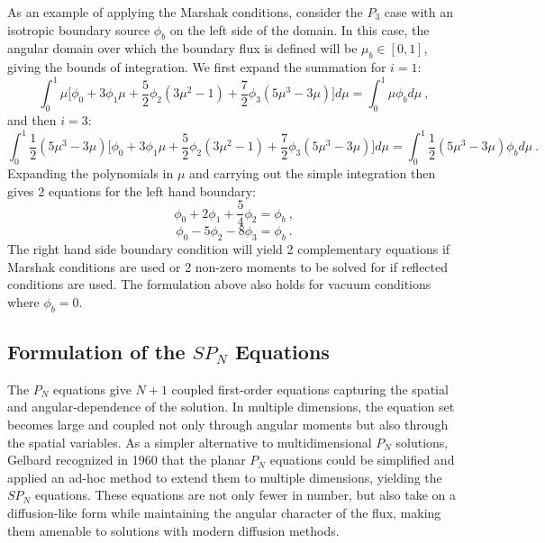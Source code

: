 \documentclass[letterpaper,12pt]{article}
\begin{document}
As an example of applying the Marshak conditions, consider the $P_3$
case with an isotropic boundary source $\phi_b$ on the left side of
the domain. In this case, the angular domain over which the boundary
flux is defined will be $\mu_b \in [0,1]$, giving the bounds of
integration. We first expand the summation for $i=1$:
\begin{equation}
  \int_0^1 \mu \Bigg[ \phi_0 + 3\phi_1\mu +
    \frac{5}{2}\phi_2(3\mu^2-1) + \frac{7}{2}\phi_3(5\mu^3-3\mu)
    \Bigg] d\mu = \int_0^1 \mu \phi_b d\mu\:,
  \label{eq:marshak_p1_deriv_1}
\end{equation}
and then $i=3$:
\begin{equation}
  \int_0^1 \frac{1}{2}(5\mu^3-3\mu) \Bigg[ \phi_0 + 3\phi_1\mu +
    \frac{5}{2}\phi_2(3\mu^2-1) + \frac{7}{2}\phi_3(5\mu^3-3\mu)
    \Bigg] d\mu = \int_0^1 \frac{1}{2}(5\mu^3-3\mu) \phi_b d\mu\:.
  \label{eq:marshak_p3_deriv_1}
\end{equation}
Expanding the polynomials in $\mu$ and carrying out the simple
integration then gives 2 equations for the left hand boundary:
\begin{equation}
  \phi_0 + 2\phi_1 + \frac{5}{4}\phi_2 = \phi_b\:,
  \label{eq:marshak_p1_deriv_2}
\end{equation}
\begin{equation}
  \phi_0 - 5\phi_2 - 8\phi_3 = \phi_b\:.
  \label{eq:marshak_p1_deriv_3}
\end{equation}
The right hand side boundary condition will yield 2 complementary
equations if Marshak conditions are used or 2 non-zero moments to be
solved for if reflected conditions are used. The formulation above
also holds for vacuum conditions where $\phi_b = 0$.

\subsection{Formulation of the $SP_N$ Equations}
\label{subsec:spn_equations}
The $P_N$ equations give $N+1$ coupled first-order equations
capturing the spatial and angular-dependence of the solution. In
multiple dimensions, the equation set becomes large and coupled not
only through angular moments but also through the spatial
variables. As a simpler alternative to multidimensional $P_N$
solutions, Gelbard recognized in 1960 that the planar $P_N$ equations
could be simplified and applied an ad-hoc method to extend them to
multiple dimensions, yielding the $SP_N$ equations. These equations
are not only fewer in number, but also take on a diffusion-like form
while maintaining the angular character of the flux, making them
amenable to solutions with modern diffusion methods.
\end{document}
